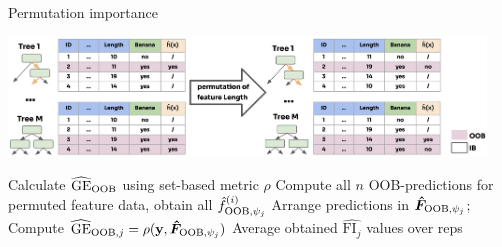 \documentclass[11pt,compress,t,notes=noshow, xcolor=table]{beamer}
\begin{document}
\begin{vbframe}{Permutation importance}

\includegraphics[width = 0.95\textwidth]{figure_man/forest-permutation-imp.png}
\vspace{-1.2ex}
\begin{algorithm}[H]
\footnotesize
\begin{algorithmic}[1]
  \State Calculate $\widehat{\mathrm{GE}}_{\mathrm{OOB}}$ using set-based metric $\rho$
	  \State Compute all $n$ OOB-predictions for permuted feature data, obtain all $\hat{f}^{(i)}_{\mathrm{OOB},\psi_j}$
    \State Arrange predictions in $\bm{\hat{F}}_{\mathrm{OOB},\psi_j}$;
    Compute $\widehat{\mathrm{GE}}_{\mathrm{OOB}, j} = \rho(\mathbf{y}, \bm{\hat{F}}_{\mathrm{OOB},\psi_j})$
  \EndFor
  \State Average obtained $\widehat{\text{FI}_j}$ values over reps
  \EndFor
\end{algorithmic}
\end{algorithm}
\vspace{-3ex}
\end{vbframe}
\end{document}
